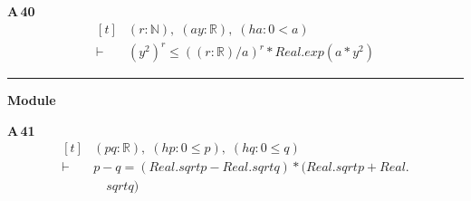 \noindent\textbf{A\,40}\quad{}
{\footnotesize\[ \begin{aligned}[t]
&(\mathit{r} : \mathbb{N} ),\; (\mathit{a} \mathit{y} : \mathbb{R} ),\; (\mathit{ha} : 0 < \mathit{a})\\
\vdash\;&(\mathit{y} ^{2}) ^{\mathit{r}} \leq ((\mathit{r} : \mathbb{R} ) / \mathit{a}) ^{\mathit{r}} * \mathit{Real}.\mathit{exp} (\mathit{a} * \mathit{y} ^{2})
\end{aligned} \]}

\vspace{4pt}\noindent\rule{\columnwidth}{0.4pt}\par\vspace{2pt}
\noindent\textbf{Module }\par\vspace{3pt}

\noindent\textbf{A\,41}\quad{}
{\footnotesize\[ \begin{aligned}[t]
&(\mathit{p} \mathit{q} : \mathbb{R} ),\; (\mathit{hp} : 0 \leq \mathit{p}),\; (\mathit{hq} : 0 \leq \mathit{q})\\
\vdash\;&\mathit{p} - \mathit{q} = (\mathit{Real}.\mathit{sqrt} \mathit{p} - \mathit{Real}.\mathit{sqrt} \mathit{q}) * (\mathit{Real}.\mathit{sqrt} \mathit{p} + \mathit{Real}.\\
&\quad \mathit{sqrt} \mathit{q})
\end{aligned} \]}


